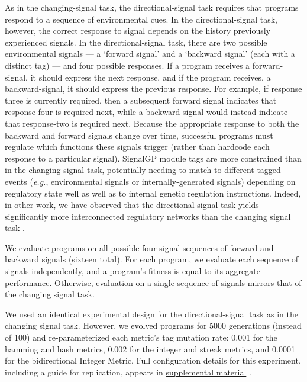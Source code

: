 As in the changing-signal task, the directional-signal task requires that programs respond to a sequence of environmental cues. 
In the directional-signal task, however, the correct response to signal depends on the history previously experienced signals.
In the directional-signal task, there are two possible environmental signals --- a `forward signal' and a `backward signal' (each with a distinct tag) ---  and four possible responses.
If a program receives a forward-signal, it should express the next response, and if the program receives, a backward-signal, it should express the previous response.
For example, if response three is currently required, then a subsequent forward signal indicates that response four is required next, while a backward signal would instead indicate that response-two is required next.
Because the appropriate response to both the backward and forward signals change over time, successful programs must regulate which functions these signals trigger (rather than hardcode each response to a particular signal).
SignalGP module tags are more constrained than in the changing-signal task, potentially needing to match to different tagged events (\textit{e.g.}, environmental signals or internally-generated signals) depending on regulatory state well as well as to internal genetic regulation instructions.
Indeed, in other work, we have observed that the directional signal task yields significantly more interconnected regulatory networks than the changing signal task \citep{Lalejini_Moreno_Ofria_2020}.

We evaluate programs on all possible four-signal sequences of forward and backward signals (sixteen total).
For each program, we evaluate each sequence of signals independently, and a program's fitness is equal to its aggregate performance.
Otherwise, evaluation on a single sequence of signals mirrors that of the changing signal task.

We used an identical experimental design for the directional-signal task as in the changing signal task. 
However, we evolved programs for 5000 generations (instead of 100) and re-parameterized each metric's tag mutation rate:
0.001 for the hamming and hash metrics, 0.002 for the integer and streak metrics, and 0.0001 for the bidirectional Integer Metric. 
Full configuration details for this experiment, including a guide for replication, appears in \href{doi.org/10.17605/OSF.IO/GW5MC}{supplemental material} \cite{Moreno_Ofria_2020}.

